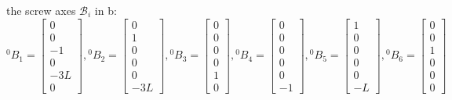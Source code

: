 \documentclass[onecolumn,oneside]{SUSTechHomework}
\begin{document}
  the screw axes \(\mathcal{B}_i\) in {b}:
  \[
    {}^0B_1 = \begin{bmatrix}
      0 \\ 0 \\ -1 \\ 0 \\ -3L \\ 0
    \end{bmatrix},
    {}^0B_2 = \begin{bmatrix}
      0 \\ 1 \\ 0 \\ 0 \\ 0 \\ -3L
    \end{bmatrix},
    {}^0B_3 = \begin{bmatrix}
      0 \\ 0 \\ 0 \\ 0 \\ 1 \\ 0
    \end{bmatrix},
    {}^0B_4 = \begin{bmatrix}
      0 \\ 0 \\ 0 \\ 0 \\ 0 \\ -1
    \end{bmatrix},
    {}^0B_5 = \begin{bmatrix}
      1 \\ 0 \\ 0 \\ 0 \\ 0 \\ -L
    \end{bmatrix},
    {}^0B_6 = \begin{bmatrix}
      0 \\ 0 \\ 1 \\ 0 \\ 0 \\ 0
    \end{bmatrix}
  \]
\end{document}
